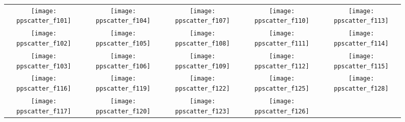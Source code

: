 \documentclass{article}
\begin{document}
\begin{figure}
\begin{tabular}{*{5}{@{}c@{}}}
    \texttt{[image: ppscatter\_f101]}&
    \texttt{[image: ppscatter\_f104]}&
    \texttt{[image: ppscatter\_f107]}&
    \texttt{[image: ppscatter\_f110]}&
    \texttt{[image: ppscatter\_f113]}\\
    \texttt{[image: ppscatter\_f102]}&
    \texttt{[image: ppscatter\_f105]}&
    \texttt{[image: ppscatter\_f108]}&
    \texttt{[image: ppscatter\_f111]}&
    \texttt{[image: ppscatter\_f114]}\\
    \texttt{[image: ppscatter\_f103]}&
    \texttt{[image: ppscatter\_f106]}&
    \texttt{[image: ppscatter\_f109]}&
    \texttt{[image: ppscatter\_f112]}&
    \texttt{[image: ppscatter\_f115]}\\
\hline
    \texttt{[image: ppscatter\_f116]}&
    \texttt{[image: ppscatter\_f119]}&
    \texttt{[image: ppscatter\_f122]}&
    \texttt{[image: ppscatter\_f125]}&
    \texttt{[image: ppscatter\_f128]}\\
    \texttt{[image: ppscatter\_f117]}&
    \texttt{[image: ppscatter\_f120]}&
    \texttt{[image: ppscatter\_f123]}&
    \texttt{[image: ppscatter\_f126]}&

\end{tabular}
\end{figure}
\end{document}
